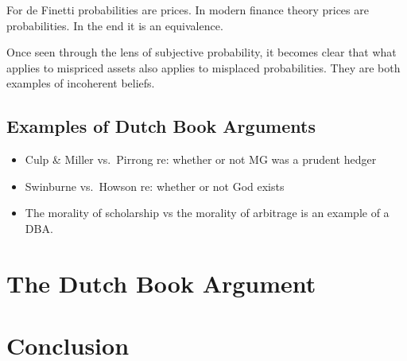 \documentclass[11pt,]{article}
\begin{document}
For de Finetti probabilities are prices. In modern finance theory prices
are probabilities. In the end it is an equivalence.

Once seen through the lens of subjective probability, it becomes clear
that what applies to mispriced assets also applies to misplaced
probabilities. They are both examples of incoherent beliefs.

\subsection{Examples of Dutch Book
Arguments}\label{examples-of-dutch-book-arguments}

\begin{itemize}
\item
  Culp \& Miller vs.~Pirrong re: whether or not MG was a prudent hedger
\item
  Swinburne vs.~Howson re: whether or not God exists
\item
  The morality of scholarship vs the morality of arbitrage is an example
  of a DBA.
\end{itemize}

\section{The Dutch Book Argument}\label{the-dutch-book-argument}

\section{Conclusion}\label{conclusion}

\newpage
\singlespacing 

\end{document}
